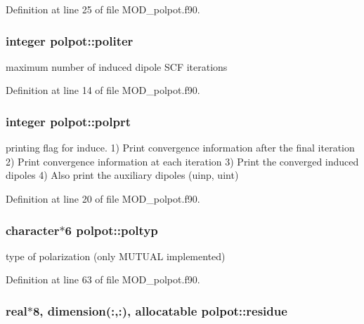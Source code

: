 Definition at line 25 of file M\-O\-D\-\_\-polpot.\-f90.

\hypertarget{classpolpot_a2f2e089f358cca82ea56802e31055b19}{
\subsubsection[{politer}]{\setlength{\rightskip}{0pt plus 5cm}integer polpot\-::politer}}\label{classpolpot_a2f2e089f358cca82ea56802e31055b19}


maximum number of induced dipole S\-C\-F iterations 



Definition at line 14 of file M\-O\-D\-\_\-polpot.\-f90.

\hypertarget{classpolpot_a1aa897b603b5d8dfe804e35c572d9994}{
\subsubsection[{polprt}]{\setlength{\rightskip}{0pt plus 5cm}integer polpot\-::polprt}}\label{classpolpot_a1aa897b603b5d8dfe804e35c572d9994}


printing flag for induce. 1) Print convergence information after the final iteration 2) Print convergence information at each iteration 3) Print the converged induced dipoles 4) Also print the auxiliary dipoles (uinp, uint) 



Definition at line 20 of file M\-O\-D\-\_\-polpot.\-f90.

\hypertarget{classpolpot_a06e16babc1553350168df1b66dcc2f3e}{
\subsubsection[{poltyp}]{\setlength{\rightskip}{0pt plus 5cm}character$\ast$6 polpot\-::poltyp}}\label{classpolpot_a06e16babc1553350168df1b66dcc2f3e}


type of polarization (only M\-U\-T\-U\-A\-L implemented) 



Definition at line 63 of file M\-O\-D\-\_\-polpot.\-f90.

\hypertarget{classpolpot_a370c16f371afeaa70933a018b220beb4}{
\subsubsection[{residue}]{\setlength{\rightskip}{0pt plus 5cm}real$\ast$8, dimension(\-:,\-:), allocatable polpot\-::residue}}\label{classpolpot_a370c16f371afeaa70933a018b220beb4}


